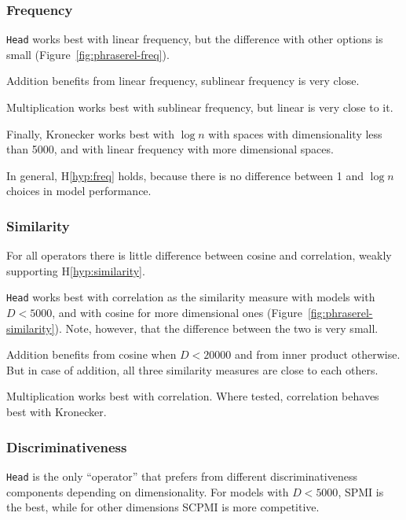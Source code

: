 \subsubsection{Frequency}
\label{sec:frequency-phraserel}



\texttt{Head} works best with linear frequency, but the difference with other options is small (Figure~\ref{fig:phraserel-freq}).

Addition benefits from linear frequency, sublinear frequency is very close.

Multiplication works best with sublinear frequency, but linear is very close to it.

Finally, Kronecker works best with $\log n$ with spaces with dimensionality less than 5000, and with linear frequency with more dimensional spaces.

In general, H\ref{hyp:freq} holds, because there is no difference between 1 and $\log n$ choices in model performance.

\subsubsection{Similarity}
\label{sec:similarity-phraserel}

For all operators there is little difference between cosine and correlation, weakly supporting H\ref{hyp:similarity}.

\texttt{Head} works best with correlation as the similarity measure with models with $D < 5000$, and with cosine for more dimensional ones (Figure~\ref{fig:phraserel-similarity}). Note, however, that the difference between the two is very small.

Addition benefits from cosine when $D < 20000$ and from inner product otherwise. But in case of addition, all three similarity measures are close to each others.

Multiplication works best with correlation. Where tested, correlation behaves best with Kronecker.

\subsubsection{Discriminativeness}
\label{sec:discriminativeness-phraserel}



\texttt{Head} is the only ``operator'' that prefers from different discriminativeness components depending on dimensionality. For models with $D < 5000$, SPMI is the best, while for other dimensions SCPMI is more competitive.

